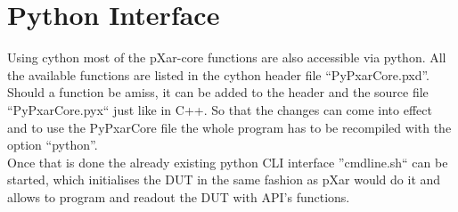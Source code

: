 \section{Python Interface}
Using cython most of the pXar-core functions are also accessible via python. All the available functions are listed in the cython header file \linebreak[4] ``PyPxarCore.pxd''. Should a function be amiss, it can be added to the header and the source file ``PyPxarCore.pyx`` just like in C++. So that the changes can come into effect and to use the PyPxarCore file the whole program has to be recompiled with the option ``python''.\\
Once that is done the already existing python \ac{CLI} interface ''cmdline.sh`` can be started, which initialises the \ac{DUT} in the same fashion as pXar would do it and allows to program and readout the \ac{DUT} with \ac{API}'s functions.
